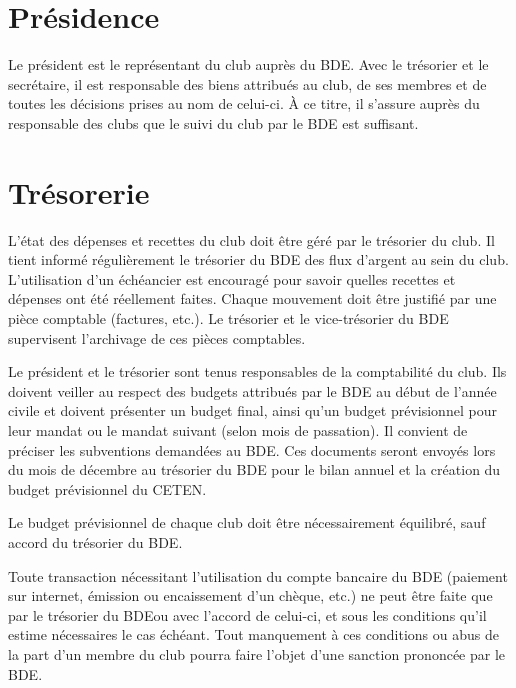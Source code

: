 \documentclass{article}
\begin{document}
\begin{multicols}{2}
		\section{Présidence}
\label{sec:presidence}

		{\small

			Le président est le représentant du club auprès du BDE\@. Avec le
			trésorier et le secrétaire, il est responsable des biens attribués
			au club, de ses membres et de toutes les décisions prises au nom de
			celui-ci. À ce titre, il s'assure auprès du responsable des clubs
			que le suivi du club par le BDE est suffisant. 

		}

		\section{Trésorerie}
\label{sec:tresorerie}

		{\small
		
			L’état des dépenses et recettes du club doit être géré par le
			trésorier du club. Il tient informé régulièrement le trésorier du
			BDE des flux d’argent au sein du club. L’utilisation d’un échéancier
			est encouragé pour savoir quelles recettes et dépenses ont été
			réellement faites. Chaque mouvement doit être justifié par une pièce
			comptable (factures, etc.). Le trésorier et le vice-trésorier du BDE
			supervisent l'archivage de ces pièces comptables.

			Le président et le trésorier sont tenus responsables de la
			comptabilité du club. Ils doivent veiller au respect des budgets
			attribués par le BDE au début de l’année civile et doivent présenter
			un budget final, ainsi qu’un budget prévisionnel pour leur mandat ou
			le mandat suivant (selon mois de passation). Il convient de préciser
			les subventions demandées au BDE\@. Ces documents seront envoyés
			lors du mois de décembre au trésorier du BDE pour le bilan annuel et
			la création du budget prévisionnel du CETEN\@.

			Le budget prévisionnel de chaque club doit être nécessairement
			équilibré, sauf accord du trésorier du BDE\@.

			Toute transaction nécessitant l’utilisation du compte bancaire du
			BDE (paiement sur internet, émission ou encaissement d’un chèque,
			etc.) ne peut être faite que par le trésorier du BDE\@ ou avec
			l'accord de celui-ci, et sous les conditions qu'il estime
			nécessaires le cas échéant. Tout manquement à ces conditions ou abus
			de la part d'un membre du club pourra faire l'objet d'une sanction
			prononcée par le BDE\@.

}
\end{multicols}
\end{document}
